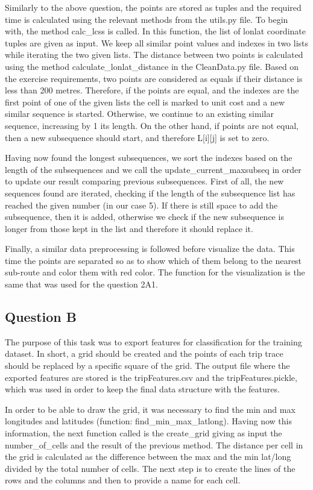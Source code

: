 \documentclass[12pt]{article}
\begin{document}
	Similarly to the above question, the points are stored as tuples and the required time is calculated using the relevant methods from the utils.py file. To begin with, the method calc\_lcss is called. In this function, the list of lonlat coordinate tuples are given as input. We keep all similar point values and indexes in two lists while iterating the two given lists. The distance between two points is calculated using the method calculate\_lonlat\_distance in the CleanData.py file. Based on the exercise requirements, two points are considered as equals if their distance is less than 200 metres. Therefore, if the points are equal, and the indexes are the first point of one of the given lists the cell is marked to unit cost and a new similar sequence is started. Otherwise, we continue to an existing similar sequence, increasing by 1 its length.  On the other hand, if points are not equal, then a new subsequence should start, and therefore L[i][j] is set to zero.
	
	Having now found the longest subsequences, we sort the indexes based on the length of the subsequences and we call the update\_current\_maxsubseq in order to update our result comparing previous subsequences. First of all, the new sequences found are iterated, checking if the length of the subsequence list has reached the given number (in our case 5). If there is still space to add the subsequence, then it is added, otherwise we check if the new subsequence is longer from those kept in the list and therefore it should replace it.
	
	Finally, a similar data preprocessing is followed before visualize the data. This time the points are separated so as to show which of them belong to the nearest sub-route and color them with red color. The function for the visualization is the same that was used for the question 2A1.
	
	\subsection{Question B}
	The purpose of this task was to export features for classification for the training dataset. In short, a grid should be created and the points of each trip trace should be replaced by a specific square of the grid. The output file where the exported features are stored is the tripFeatures.csv and the tripFeatures.pickle, which was used in order to keep the final data structure with the features.
	
	In order to be able to draw the grid, it was necessary to find the min and max longitudes and latitudes (function: find\_min\_max\_latlong). Having now this information, the next function called is the create\_grid giving as input the number\_of\_cells and the result of the previous method. The distance per cell in the grid is calculated as the difference between the max and the min lat/long divided by the total number of cells. The next step is to create the lines of the rows and the columns and then to provide a name for each cell.
	
\end{document}
